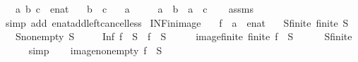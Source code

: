 \begin{isabellebody}
\ \ \ a\ b\ c\ {\isacharcolon}{\kern0pt}{\isacharcolon}{\kern0pt}\ enat\isanewline
\ \ \ {\isachardoublequoteopen}b\ {\isacharless}{\kern0pt}\ c{\isachardoublequoteclose}\isanewline
\ \ \ {\isachardoublequoteopen}a\ {\isasymnoteq}\ {\isasyminfinity}{\isachardoublequoteclose}\isanewline
\ \ \ {\isachardoublequoteopen}a\ {\isacharplus}{\kern0pt}\ b\ {\isacharless}{\kern0pt}\ a\ {\isacharplus}{\kern0pt}\ c{\isachardoublequoteclose}\isanewline
%
\isadelimproof
\ \ %
\endisadelimproof
%
\isatagproof
{}\isamarkupfalse%
\ assms\isanewline
\ \ \isamarkupfalse%
\ {\isacharparenleft}{\kern0pt}simp\ add{\isacharcolon}{\kern0pt}\ enat{\isacharunderscore}{\kern0pt}add{\isacharunderscore}{\kern0pt}left{\isacharunderscore}{\kern0pt}cancel{\isacharunderscore}{\kern0pt}less{\isacharparenright}{\kern0pt}%
\endisatagproof
{\isafoldproof}%
%
\isadelimproof
\isanewline
%
\endisadelimproof
\isanewline
{}\isamarkupfalse%
\ INF{\isacharunderscore}{\kern0pt}in{\isacharunderscore}{\kern0pt}image{\isacharcolon}{\kern0pt}\isanewline
\ \ \ f\ {\isacharcolon}{\kern0pt}{\isacharcolon}{\kern0pt}\ {\isachardoublequoteopen}{\isacharprime}{\kern0pt}a\ {\isasymRightarrow}\ enat{\isachardoublequoteclose}\isanewline
\ \ \ S{\isacharunderscore}{\kern0pt}finite{\isacharcolon}{\kern0pt}\ {\isachardoublequoteopen}finite\ S{\isachardoublequoteclose}\isanewline
\ \ \ S{\isacharunderscore}{\kern0pt}non{\isacharunderscore}{\kern0pt}empty{\isacharcolon}{\kern0pt}\ {\isachardoublequoteopen}S\ {\isasymnoteq}\ {\isacharbraceleft}{\kern0pt}{\isacharbraceright}{\kern0pt}{\isachardoublequoteclose}\isanewline
\ \ \ {\isachardoublequoteopen}Inf\ {\isacharparenleft}{\kern0pt}f\ {\isacharbackquote}{\kern0pt}\ S{\isacharparenright}{\kern0pt}\ {\isasymin}\ f\ {\isacharbackquote}{\kern0pt}\ S{\isachardoublequoteclose}\isanewline
%
\isadelimproof
%
\endisadelimproof
%
\isatagproof
{}\isamarkupfalse%
\ {\isacharminus}{\kern0pt}\isanewline
\ \ \isamarkupfalse%
\ image{\isacharunderscore}{\kern0pt}finite{\isacharcolon}{\kern0pt}\ {\isachardoublequoteopen}finite\ {\isacharparenleft}{\kern0pt}f\ {\isacharbackquote}{\kern0pt}\ S{\isacharparenright}{\kern0pt}{\isachardoublequoteclose}\isanewline
\ \ \ \ \isamarkupfalse%
\ S{\isacharunderscore}{\kern0pt}finite\isanewline
\ \ \ \ \isamarkupfalse%
\ simp\isanewline
\ \ \isamarkupfalse%
\ image{\isacharunderscore}{\kern0pt}non{\isacharunderscore}{\kern0pt}empty{\isacharcolon}{\kern0pt}\ {\isachardoublequoteopen}{\isacharparenleft}{\kern0pt}f\ {\isacharbackquote}{\kern0pt}\ S{\isacharparenright}{\kern0pt}\ {\isasymnoteq}\ {\isacharbraceleft}{\kern0pt}{\isacharbraceright}{\kern0pt}{\isachardoublequoteclose}\isanewline

\end{isabellebody}
